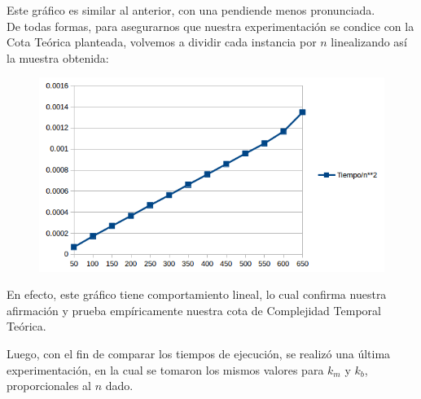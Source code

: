   
  Este gr\'afico es similar al anterior, con una pendiende menos pronunciada.\\
  
  De todas formas, para asegurarnos que nuestra experimentaci\'on se condice con la Cota Te\'orica planteada, volvemos a dividir cada instancia por $n$ linealizando as\'i la muestra obtenida:\\
  
    \begin{figure}[h!]
   \begin{center}
	\includegraphics[scale=0.8]{imagenes/ej1/peorCaso3.png}
   \end{center}
  \end{figure}
  
  En efecto, este gr\'afico tiene comportamiento lineal, lo cual confirma nuestra afirmaci\'on y prueba emp\'iricamente nuestra cota de Complejidad Temporal Te\'orica.
  
  \newpage
  
  Luego, con el fin de comparar los tiempos de ejecuci\'on, se realiz\'o una \'ultima experimentaci\'on, en la cual se tomaron los mismos valores para $k_m$ y $k_b$, proporcionales al $n$ dado.\\
  
